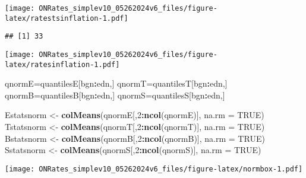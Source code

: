 \documentclass[
]{article}
\newenvironment{Shaded}{\begin{snugshade}}{\end{snugshade}}
\newcommand{\AttributeTok}[1]{\textcolor[rgb]{0.13,0.29,0.53}{#1}}
\newcommand{\ConstantTok}[1]{\textcolor[rgb]{0.56,0.35,0.01}{#1}}
\newcommand{\DecValTok}[1]{\textcolor[rgb]{0.00,0.00,0.81}{#1}}
\newcommand{\FunctionTok}[1]{\textcolor[rgb]{0.13,0.29,0.53}{\textbf{#1}}}
\newcommand{\NormalTok}[1]{#1}
\newcommand{\OtherTok}[1]{\textcolor[rgb]{0.56,0.35,0.01}{#1}}
\newcommand{\SpecialCharTok}[1]{\textcolor[rgb]{0.81,0.36,0.00}{\textbf{#1}}}
\let\origfigure\figure
\let\endorigfigure\endfigure
\renewenvironment{figure}[1][2] {
    \expandafter\origfigure\expandafter[H]
} {
    \endorigfigure
}
\begin{document}
\begin{figure}
\centering
\texttt{[image: ONRates\_simplev10\_05262024v6\_files/figure-latex/ratestsinflation-1.pdf]}
\caption{\label{fig:ratestsinflation}Rates during Taming inflation 3/17/2022-12/14/2023}
\end{figure}

\begin{verbatim}
## [1] 33
\end{verbatim}

\begin{figure}
\centering
\texttt{[image: ONRates\_simplev10\_05262024v6\_files/figure-latex/ratesinflation-1.pdf]}
\caption{\label{fig:ratesinflation}EFFR during inflation period 3/17/2022-12/14/2023}
\end{figure}

\begin{Shaded}
\begin{Highlighting}[]
\NormalTok{qnormE}\OtherTok{=}\NormalTok{quantilesE[bgn}\SpecialCharTok{:}\NormalTok{edn,]}
\NormalTok{qnormT}\OtherTok{=}\NormalTok{quantilesT[bgn}\SpecialCharTok{:}\NormalTok{edn,] }
\NormalTok{qnormB}\OtherTok{=}\NormalTok{quantilesB[bgn}\SpecialCharTok{:}\NormalTok{edn,] }
\NormalTok{qnormS}\OtherTok{=}\NormalTok{quantilesS[bgn}\SpecialCharTok{:}\NormalTok{edn,] }

\NormalTok{Estatsnorm }\OtherTok{\textless{}{-}} \FunctionTok{colMeans}\NormalTok{(qnormE[,}\DecValTok{2}\SpecialCharTok{:}\FunctionTok{ncol}\NormalTok{(qnormE)], }\AttributeTok{na.rm =} \ConstantTok{TRUE}\NormalTok{)}
\NormalTok{Tstatsnorm }\OtherTok{\textless{}{-}} \FunctionTok{colMeans}\NormalTok{(qnormT[,}\DecValTok{2}\SpecialCharTok{:}\FunctionTok{ncol}\NormalTok{(qnormT)], }\AttributeTok{na.rm =} \ConstantTok{TRUE}\NormalTok{)}
\NormalTok{Bstatsnorm }\OtherTok{\textless{}{-}} \FunctionTok{colMeans}\NormalTok{(qnormB[,}\DecValTok{2}\SpecialCharTok{:}\FunctionTok{ncol}\NormalTok{(qnormB)], }\AttributeTok{na.rm =} \ConstantTok{TRUE}\NormalTok{)}
\NormalTok{Sstatsnorm }\OtherTok{\textless{}{-}} \FunctionTok{colMeans}\NormalTok{(qnormS[,}\DecValTok{2}\SpecialCharTok{:}\FunctionTok{ncol}\NormalTok{(qnormS)], }\AttributeTok{na.rm =} \ConstantTok{TRUE}\NormalTok{)}
\end{Highlighting}
\end{Shaded}

\begin{figure}
\centering
\texttt{[image: ONRates\_simplev10\_05262024v6\_files/figure-latex/normbox-1.pdf]}
\caption{\label{fig:normbox}IQR and range during normalcy period 3/4/2016-7/31/2019}
\end{figure}
\end{document}
